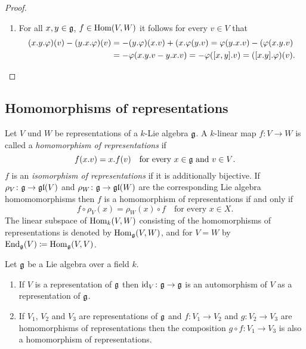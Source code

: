 \begin{proof}
\begin{enumerate}[leftmargin=*]
  \item
   For all $x,y \in \mathfrak{g}$, $f \in \operatorname{Hom}(V,W)$ it follows for every $v \in V$ that
   \begin{align*}
    (x.y.\varphi)(v) - (y.x.\varphi)(v)
    &= -(y.\varphi)(x.v) + (x.\varphi(y.v)
    = \varphi(y.x.v) - (\varphi(x.y.v) \\
    &= -\varphi(x.y.v - y.x.v)
    = -\varphi([x,y].v)
    = ([x.y].\varphi)(v).
   \qedhere
   \end{align*}
 \end{enumerate}
\end{proof}





\subsection{Homomorphisms of representations}


\begin{defi}
 Let $V$ und $W$ be representations of a $k$-Lie algebra $\mathfrak{g}$. A $k$-linear map $f \colon V \to W$ is called a \emph{homomorphism of representations} if
 \[
  f(x.v) = x.f(v) \quad \text{for every $x \in \mathfrak{g}$ and $v \in V$}.
 \]
 $f$ is an \emph{isomorphism of representations} if it is additionally bijective. If $\rho_V \colon \mathfrak{g} \to \mathfrak{gl}(V)$ and $\rho_W \colon \mathfrak{g} \to \mathfrak{gl}(W)$ are the corresponding Lie algebra homomomorphisms then $f$ is a homomorphism of representations if and only if
 \[
  f \circ \rho_V(x) = \rho_W(x) \circ f \quad \text{for every $x \in X$}.
 \]
 The linear subspace of $\operatorname{Hom}_k(V,W)$ consisting of the homomorphisms of representations is denoted by $\operatorname{Hom}_{\mathfrak{g}}(V,W)$, and for $V = W$ by $\operatorname{End}_{\mathfrak{g}}(V) \coloneqq \operatorname{Hom}_{\mathfrak{g}}(V,V)$. 
\end{defi}


\begin{expls}
 Let $\mathfrak{g}$ be a Lie algebra over a field $k$.
 \begin{enumerate}[leftmargin=*]
  \item
   If $V$ is a representation of $\mathfrak{g}$ then $\operatorname{id}_V \colon \mathfrak{g} \to \mathfrak{g}$ is an automorphism of $V$ as a representation of $\mathfrak{g}$.
  \item
   If $V_1$, $V_2$ and $V_3$ are representations of $\mathfrak{g}$ and $f \colon V_1 \to V_2$ and $g \colon V_2 \to V_3$ are homomorphisms of representations then the composition $g \circ f \colon V_1 \to V_3$ is also a homomorphism of representations.
 \end{enumerate}
\end{expls}


